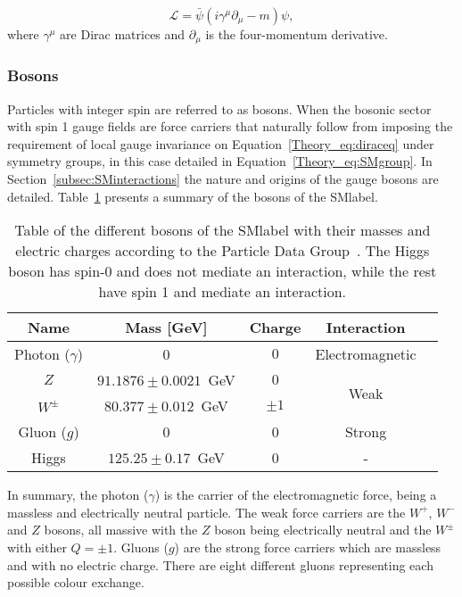 \begin{equation}
\label{Theory_eq:diraceq}
    \mathcal{L} = \bar{\psi}(i\gamma^\mu\partial_\mu-m)\psi,
\end{equation}
where $\gamma^\mu$ are Dirac matrices and $\partial_\mu$ is the four-momentum derivative.

\subsubsection{Bosons}

Particles with integer spin are referred to as bosons. When the bosonic sector with spin 1 gauge fields are force carriers that naturally follow from imposing the requirement of local gauge invariance on Equation~\ref{Theory_eq:diraceq} under symmetry groups, in this case detailed in Equation~\ref{Theory_eq:SMgroup}. In Section~\ref{subsec:SMinteractions} the nature and origins of the gauge bosons are detailed. Table~\ref{tabSM:bosonscontent} presents a summary of the bosons of the \acrshort{SMlabel}.\\

\begin{table}[htbp]
    \begin{tabular}{ccccc}
    \toprule\toprule
    Name                  & Mass [GeV] & Charge & Interaction \\ \midrule
    Photon ($\gamma$)     &  0                             &  $0$ & Electromagnetic\\
    $Z$                   &  $91.1876 \pm 0.0021$~GeV      &  $0$ & \multirow{2}{*}{Weak} \\
    $W^\pm$               &  $80.377\pm 0.012$~GeV         &  $\pm 1$ & \\
    Gluon ($g$)           &  0                             &  0 & Strong \\
    Higgs                 &  $125.25\pm0.17$~GeV           &  0      & - \\
    \bottomrule\bottomrule
    \end{tabular}
    \caption{Table of the different bosons of the \acrshort{SMlabel} with their masses and electric charges according to the Particle Data Group~\cite{pdg}. The Higgs boson has spin-0 and does not mediate an interaction, while the rest have spin 1 and mediate an interaction.}
    \label{tabSM:bosonscontent}
    \end{table}

In summary, the photon ($\gamma$) is the carrier of the electromagnetic force, being a massless and electrically neutral particle.
The weak force carriers are the $W^+$, $W^-$ and $Z$ bosons, all massive with the $Z$ boson being electrically neutral and the $W^\pm$ with either $Q=\pm1$. Gluons ($g$) are the strong force carriers which are massless and with no electric charge. There are eight different gluons representing each possible colour exchange.\\

